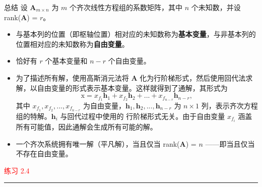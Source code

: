 \begin{bluebox}{总结}
设 \(\mathbf{A}_{m \times n}\) 为 \(m\) 个齐次线性方程组的系数矩阵，其中 \(n\) 个未知数，并设 rank(\(\mathbf{A}\)) = \(r\)。
\begin{itemize}
    \item 与基本列的位置（即枢轴位置）相对应的未知数称为\textbf{基本变量}，与非基本列的位置相对应的未知数称为\textbf{自由变量}。
    \item 恰好有 \(r\) 个基本变量和 \(n-r\) 个自由变量。
    \item 为了描述所有解，使用高斯消元法将 \(\mathbf{A}\) 化为行阶梯形式，然后使用回代法求解，以自由变量的形式表示基本变量。这样就得到了通解，其形式为
    \[
    \mathrm{x} = x_{f_1}\mathbf{h}_1 + x_{f_2}\mathbf{h}_2 + ... + x_{f_{n-r}}\mathbf{h}_{n-r},
    \]
    其中 \(x_{f_1}, x_{f_2}, ..., x_{f_{n-r}}\) 为自由变量，\(\mathbf{h}_1, \mathbf{h}_2, ..., \mathbf{h}_{n-r}\) 为 \(n \times 1\) 列，表示齐次方程组的特解。\(\mathbf{h}_i\) 与回代过程中使用的
    行阶梯形式无关。由于自由变量 \(x_{f_i}\) 涵盖所有可能值，因此通解会生成所有可能的解。
    \item 一个齐次系统拥有唯一解（平凡解），当且仅当 rank(\(\mathbf{A}\)) = \(n\) ——即当且仅当不存在自由变量。
\end{itemize}
\end{bluebox}


\textcolor{red}{练习 2.4}
\color{red}\rule{\textwidth}{0.4pt}\color{black}

